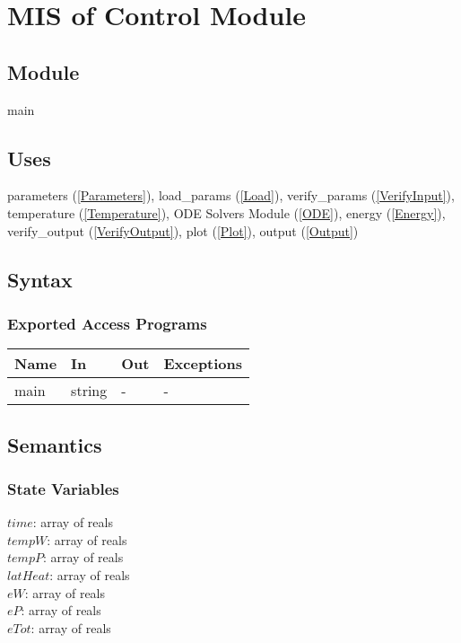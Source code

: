 \documentclass[12pt]{article}
\begin{document}
\section{MIS of Control Module} \label{Main}

\subsection{Module}

main

\subsection{Uses}

parameters (\ref{Parameters}), load\_params (\ref{Load}), verify\_params
(\ref{VerifyInput}), temperature (\ref{Temperature}), ODE Solvers Module
(\ref{ODE}), energy (\ref{Energy}), verify\_output (\ref{VerifyOutput}), plot
(\ref{Plot}), output (\ref{Output})

\subsection{Syntax}

\subsubsection{Exported Access Programs}

\begin{center}
\begin{tabular}{p{2cm} p{4cm} p{4cm} p{2cm}}
\hline
\textbf{Name} & \textbf{In} & \textbf{Out} & \textbf{Exceptions} \\
\hline
main & string & - & - \\
\hline
\end{tabular}
\end{center}

\subsection{Semantics}

\subsubsection{State Variables}

$time$: array of reals \\
$tempW$: array of reals \\
$tempP$: array of reals \\
$latHeat$: array of reals \\
$eW$: array of reals \\
$eP$: array of reals \\ 
$eTot$: array of reals
\end{document}
